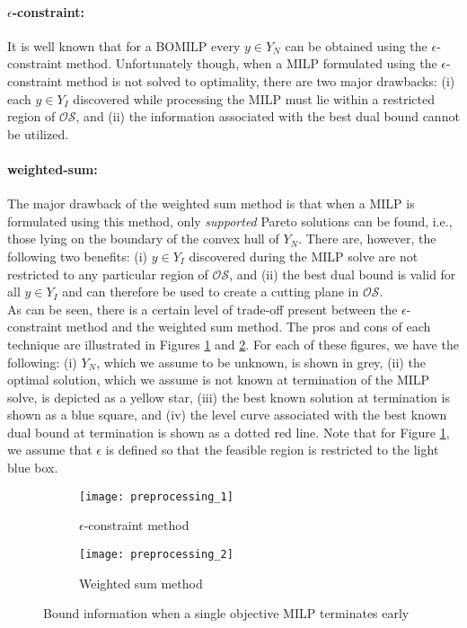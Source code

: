 \documentclass[11.5pt]{article}
\newcommand{\OS}{\mathcal{OS}}
\begin{document}
\paragraph{\textbf{$\epsilon$-constraint:}} It is well known that for a BOMILP every $y \in Y_N$ can be obtained using the $\epsilon$-constraint method. Unfortunately though, when a MILP formulated using the $\epsilon$-constraint method is not solved to optimality, there are two major drawbacks: (i) each $y\in Y_I$ discovered while processing the MILP must lie within a restricted region of $\OS$, and (ii) the information associated with the best dual bound cannot be utilized. 

\paragraph{\textbf{weighted-sum:}} The major drawback of the weighted sum method is that when a MILP is formulated using this method, only \emph{supported} Pareto solutions can be found, i.e., those lying on the boundary of the convex hull of $Y_N$. There are, however, the following two benefits: (i) $y \in Y_I$ discovered during the MILP solve are not restricted to any particular region of $\OS$, and (ii) the best dual bound is valid for all $y \in Y_I$ and can therefore be used to create a cutting plane in $\OS$. \\

As can be seen, there is a certain level of trade-off present between the $\epsilon$-constraint method and the weighted sum method. The pros and cons of each technique are illustrated in Figures \ref{preprocessing_epsilon} and \ref{preprocessing_weighted}. For each of these figures, we have the following: (i) $Y_N$, which we assume to be unknown, is shown in grey, (ii) the optimal solution, which we assume is not known at termination of the MILP solve, is depicted as a yellow star, (iii) the best known solution at termination is shown as a blue square, and (iv) the level curve associated with the best known dual bound at termination is shown as a dotted red line. Note that for Figure \ref{preprocessing_epsilon}, we assume that $\epsilon$ is defined so that the feasible region is restricted to the light blue box. 

\begin{figure}
\begin{subfigure}[h]{.48\textwidth}
\centering
\texttt{[image: preprocessing\_1]}
\caption{$\epsilon$-constraint method}
\label{preprocessing_epsilon}
\end{subfigure} 
\begin{subfigure}[h]{.48\textwidth}
\centering
\texttt{[image: preprocessing\_2]}
\caption{Weighted sum method}
\label{preprocessing_weighted}
\end{subfigure}
\caption{Bound information when a single objective MILP terminates early}
\label{preprocessing_fig}
\end{figure}~\\
\end{document}
